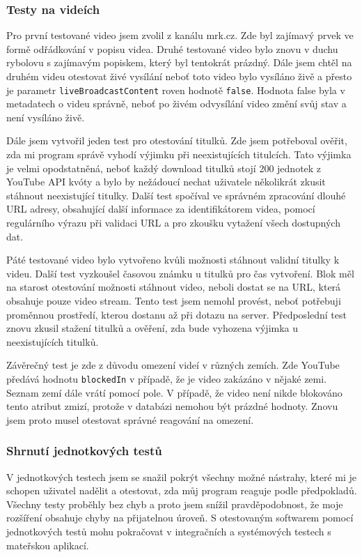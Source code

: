 \subsubsection{Testy na videích}
\par Pro první testované video jsem zvolil  z kanálu mrk.cz. Zde byl zajímavý prvek ve formě odřádkování v popisu videa. Druhé testované video bylo znovu v duchu rybolovu s zajímavým popiskem, který byl tentokrát prázdný. Dále jsem chtěl na druhém videu otestovat živé vysílání neboť toto video bylo vysíláno živě a přesto je parametr \texttt{liveBroadcastContent} roven hodnotě \texttt{false}. Hodnota false byla v metadatech o videu správně, neboť po živém odvysílání video změní svůj stav a není vysíláno živě.
\par Dále jsem vytvořil jeden test pro otestování titulků. Zde jsem potřeboval ověřit, zda mi program správě vyhodí výjimku při neexistujících titulcích. Tato výjimka je velmi opodstatněná, neboť každý download titulků stojí 200 jednotek z YouTube API kvóty a bylo by nežádoucí nechat uživatele několikrát zkusit stáhnout neexistující titulky. Další test spočíval ve správném zpracování dlouhé URL adresy, obsahující další informace za identifikátorem videa, pomocí regulárního výrazu při validaci URL a pro zkoušku vytažení všech dostupných dat.
\par Páté testované video bylo vytvořeno kvůli možnosti stáhnout validní titulky k videu. Další test vyzkoušel časovou známku u titulků pro čas vytvoření. Blok  měl na starost otestování možnosti stáhnout video, neboli dostat se na URL, která obsahuje pouze video stream. Tento test jsem nemohl provést, neboť potřebuji proměnnou prostředí, kterou dostanu až při dotazu na server. Předposlední test znovu zkusil stažení titulků a ověření, zda bude vyhozena výjimka u neexistujících titulků.
\par Závěrečný test je zde z důvodu omezení videí v různých zemích. Zde YouTube předává hodnotu \texttt{blockedIn} v případě, že je video zakázáno v nějaké zemi. Seznam zemí dále vrátí pomocí pole. V případě, že video není nikde blokováno tento atribut zmizí, protože v databázi nemohou být prázdné hodnoty. Znovu jsem proto musel otestovat správné reagování na omezení.
\subsubsection{Shrnutí jednotkových testů}
\par V jednotkových testech jsem se snažil pokrýt všechny možné nástrahy, které mi je schopen uživatel nadělit a otestovat, zda můj program reaguje podle předpokladů. Všechny testy proběhly bez chyb a proto jsem snížil pravděpodobnost, že moje rozšíření obsahuje chyby na přijatelnou úroveň. S otestovaným softwarem pomocí jednotkových testů mohu pokračovat v integračních a systémových testech s mateřskou aplikací.

